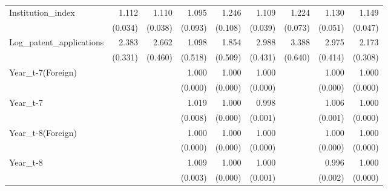 \begin{table}[htbp]
\begin{tabular}{l*{8}{D{.}{.}{-1}}}
Institution\_index&       1.112\sym{***}&       1.110\sym{***}&       1.095         &       1.246\sym{**} &       1.109\sym{***}&       1.224\sym{***}&       1.130\sym{***}&       1.149\sym{***}\\
            &     (0.034)         &     (0.038)         &     (0.093)         &     (0.108)         &     (0.039)         &     (0.073)         &     (0.051)         &     (0.047)         \\
Log\_patent\_applications&       2.383\sym{***}&       2.662\sym{***}&       1.098         &       1.854\sym{**} &       2.988\sym{***}&       3.388\sym{***}&       2.975\sym{***}&       2.173\sym{***}\\
            &     (0.331)         &     (0.460)         &     (0.518)         &     (0.509)         &     (0.431)         &     (0.640)         &     (0.414)         &     (0.308)         \\
Year\_t-7(Foreign)&                     &                     &       1.000\sym{***}&       1.000         &       1.000\sym{***}&                     &       1.000         &       1.000\sym{*}  \\
            &                     &                     &     (0.000)         &     (0.000)         &     (0.000)         &                     &     (0.000)         &     (0.000)         \\
Year\_t-7    &                     &                     &       1.019\sym{**} &       1.000\sym{**} &       0.998\sym{**} &                     &       1.006\sym{***}&       1.000         \\
            &                     &                     &     (0.008)         &     (0.000)         &     (0.001)         &                     &     (0.001)         &     (0.000)         \\
Year\_t-8(Foreign)&                     &                     &       1.000\sym{*}  &       1.000         &       1.000\sym{***}&                     &       1.000         &       1.000         \\
            &                     &                     &     (0.000)         &     (0.000)         &     (0.000)         &                     &     (0.000)         &     (0.000)         \\
Year\_t-8    &                     &                     &       1.009\sym{***}&       1.000         &       1.000         &                     &       0.996\sym{**} &       1.000         \\
            &                     &                     &     (0.003)         &     (0.000)         &     (0.001)         &                     &     (0.002)         &     (0.000)         \\

\end{tabular}
\end{table}
